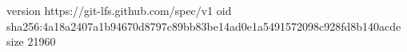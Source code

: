 version https://git-lfs.github.com/spec/v1
oid sha256:4a18a2407a1b94670d8797c89bb83be14ad0e1a5491572098c928fd8b140acde
size 21960
